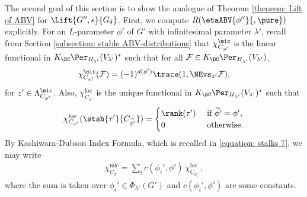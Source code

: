 \documentclass[11pt,letterpaper]{amsart}
\numberwithin{equation}{section}
\begin{document}
The second goal of this section is to show the analogue of Theorem \ref{theorem: Lift of ABV} for $\Lift{G'',s}{G_{\delta}}$. 
First, we compute $R(\etaABV{\phi''}{, \pure})$ explicitly. For an $L$-parameter $\phi'$ of $G'$ with infinitesimal parameter $\lambda'$, recall from Section \ref{subsection: stable ABV-distributions} that $\chi_{C_{\phi'}}^{\mic}$ is the linear functional in $K_\BC \Per_{H_{\lambda'}}(V_{\lambda'})^{\ast}$ such that for all $\mathcal{F} \in K_\BC \Per_{H_{\lambda'}}(V_{\lambda'})$, 
\[ \chi_{C_{\phi'}}^{\mic}(\mathcal{F})= (-1)^{d(\phi')} \trace(1, \NEvs_{z'} \mathcal{F}), \]
for $z'\in \Lambda^\mic_{C_{\phi'}}$. Also, $\chi_{C_{\phi'}}^{\textrm{loc}}$ is the unique functional in $K_\BC \Per_{H_{\lambda'}}(V_{\lambda'})^{\ast}$ such that 
\[ \chi_{C_{\phi'}}^{\textrm{loc}}( \stsh{\tau'}{C_{\widetilde{\phi'}}} ) =\begin{cases}
   \rank(\tau') & \text{ if }\widetilde{\phi'}=\phi',\\
    0 &\text{ otherwise.}
\end{cases}\]
By Kashiwara-Dubson Index Formula, which is recalled in \eqref{equation: stalks 7}, we may write
\begin{align}\label{eq: Kashiwara-Dubson G'}
    \chi^\textrm{mic}_{C_{\phi'}} = \sum_{i} c(\phi_i',\phi')\, \chi^\textrm{loc}_{C_{\phi_i'}},
\end{align}
where the sum is taken over $\phi_i' \in \Phi_{\lambda'}(G')$ and $ c(\phi_i',\phi')$ are some constants.
\end{document}
